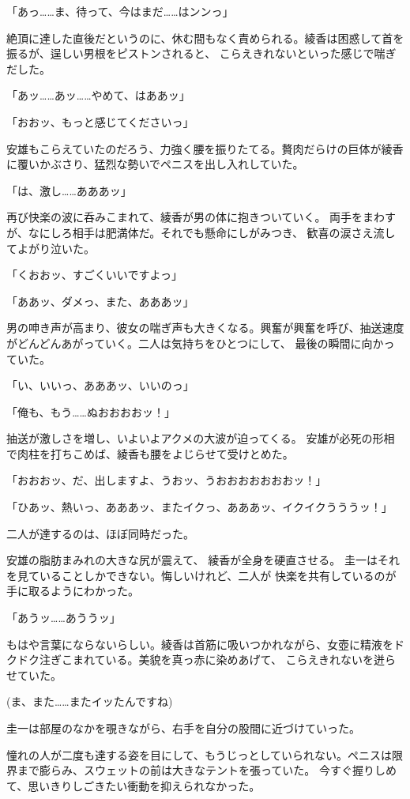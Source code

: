 ﻿\documentclass[
    book,tate,
    line_length=30zw,
    jafontsize=12pt,
    paper=b5j,
    landscape,
    ]{jlreq}
\begin{document}
「あっ……ま、待って、今はまだ……はンンっ」

絶頂に達した直後だというのに、休む間もなく責められる。綾香は困惑して首を振るが、逞しい男根をピストンされると、
こらえきれないといった感じで喘ぎだした。

「あッ……あッ……やめて、はああッ」

「おおッ、もっと感じてくださいっ」

安雄もこらえていたのだろう、力強く腰を振りたてる。贅肉だらけの巨体が綾香に覆いかぶさり、猛烈な勢いでペニスを出し入れしていた。

「は、激し……あああッ」

再び快楽の波に呑みこまれて、綾香が男の体に抱きついていく。 両手をまわすが、なにしろ相手は肥満体だ。それでも懸命にしがみつき、
歓喜の涙さえ流してよがり泣いた。

「くおおッ、すごくいいですよっ」

「ああッ、ダメっ、また、あああッ」

男の呻き声が高まり、彼女の喘ぎ声も大きくなる。興奮が興奮を呼び、抽送速度がどんどんあがっていく。二人は気持ちをひとつにして、
最後の瞬間に向かっていた。

「い、いいっ、あああッ、いいのっ」

「俺も、もう……ぬおおおおッ！」

抽送が激しさを増し、いよいよアクメの大波が迫ってくる。 安雄が必死の形相で肉柱を打ちこめば、綾香も腰をよじらせて受けとめた。

「おおおッ、だ、出しますよ、うおッ、うおおおおおおおッ！」

「ひあッ、熱いっ、あああッ、またイクっ、あああッ、イクイクうううッ！」

二人が達するのは、ほぼ同時だった。

安雄の脂肪まみれの大きな尻が震えて、 綾香が全身を硬直させる。 圭一はそれを見ていることしかできない。悔しいけれど、二人が
快楽を共有しているのが手に取るようにわかった。

「あうッ……あううッ」

もはや言葉にならないらしい。綾香は首筋に吸いつかれながら、女壺に精液をドクドク注ぎこまれている。美貌を真っ赤に染めあげて、
こらえきれないを迸らせていた。

(ま、また……またイッたんですね)

圭一は部屋のなかを覗きながら、右手を自分の股間に近づけていった。

憧れの人が二度も達する姿を目にして、もうじっとしていられない。ペニスは限界まで膨らみ、スウェットの前は大きなテントを張っていた。
今すぐ握りしめて、思いきりしごきたい衝動を抑えられなかった。
\end{document}
